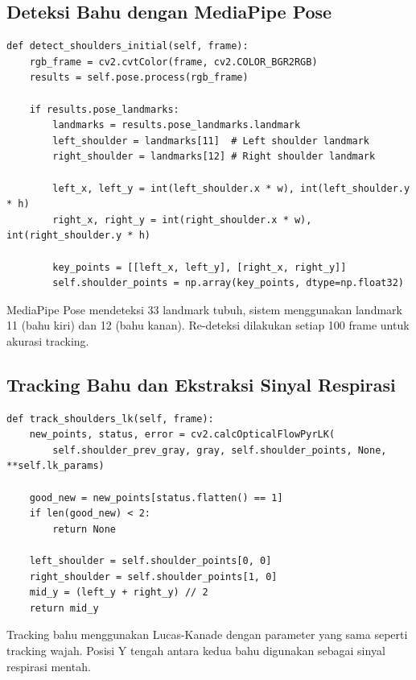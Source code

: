 \documentclass[11pt,a4paper]{article}
\begin{document}
\subsection{Deteksi Bahu dengan MediaPipe Pose}
    \begin{lstlisting}
def detect_shoulders_initial(self, frame):
    rgb_frame = cv2.cvtColor(frame, cv2.COLOR_BGR2RGB)
    results = self.pose.process(rgb_frame)
    
    if results.pose_landmarks:
        landmarks = results.pose_landmarks.landmark
        left_shoulder = landmarks[11]  # Left shoulder landmark
        right_shoulder = landmarks[12] # Right shoulder landmark
        
        left_x, left_y = int(left_shoulder.x * w), int(left_shoulder.y * h)
        right_x, right_y = int(right_shoulder.x * w), int(right_shoulder.y * h)
        
        key_points = [[left_x, left_y], [right_x, right_y]]
        self.shoulder_points = np.array(key_points, dtype=np.float32)
    \end{lstlisting}
    MediaPipe Pose mendeteksi 33 landmark tubuh, sistem menggunakan landmark 11 (bahu kiri) dan 12 (bahu kanan). Re-deteksi dilakukan setiap 100 frame untuk akurasi tracking.

\subsection{Tracking Bahu dan Ekstraksi Sinyal Respirasi}
    \begin{lstlisting}
def track_shoulders_lk(self, frame):
    new_points, status, error = cv2.calcOpticalFlowPyrLK(
        self.shoulder_prev_gray, gray, self.shoulder_points, None, **self.lk_params)
    
    good_new = new_points[status.flatten() == 1]
    if len(good_new) < 2:
        return None
        
    left_shoulder = self.shoulder_points[0, 0]
    right_shoulder = self.shoulder_points[1, 0]
    mid_y = (left_y + right_y) // 2
    return mid_y
    \end{lstlisting}
    Tracking bahu menggunakan Lucas-Kanade dengan parameter yang sama seperti tracking wajah. Posisi Y tengah antara kedua bahu digunakan sebagai sinyal respirasi mentah.
\end{document}
